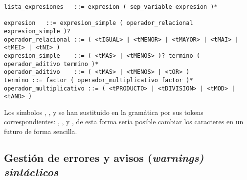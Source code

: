 \documentclass[../main.tex]{subfiles}
\begin{document}
\begin{description}
\begin{verbatim}
lista_expresiones	::=	expresion ( sep_variable expresion )*

expresion	::=	expresion_simple ( operador_relacional expresion_simple )?
operador_relacional	::=	( <tIGUAL> | <tMENOR> | <tMAYOR> | <tMAI> | <tMEI> | <tNI> )
expresion_simple	::=	( <tMAS> | <tMENOS> )? termino ( operador_aditivo termino )*
operador_aditivo	::=	( <tMAS> | <tMENOS> | <tOR> )
termino	::=	factor ( operador_multiplicativo factor )*
operador_multiplicativo	::=	( <tPRODUCTO> | <tDIVISION> | <tMOD> | <tAND> )

\end{verbatim}

\end{description}

Los símbolos \car{,}, \car{;}, \car{(} y \car{)}  se han sustituido en la gramática por sus tokens correspondientes: , ,  y , de esta forma sería posible cambiar los caracteres en un futuro de forma sencilla.

\subsection{Gestión de errores y avisos (\it{warnings}) sintácticos}
\end{document}
